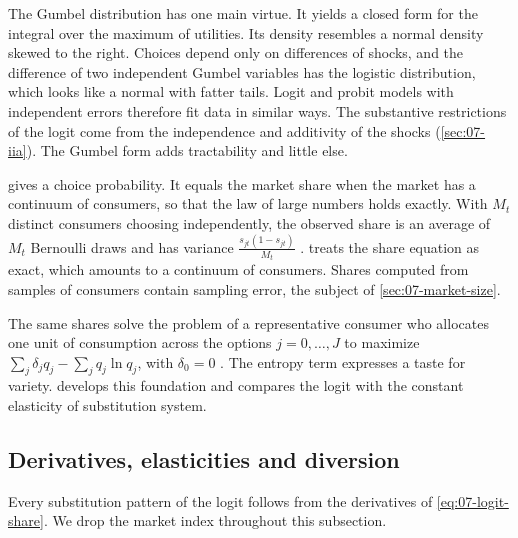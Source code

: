 \begin{remark}\label{rem:07-gumbel}
The Gumbel distribution has one main virtue. It yields a closed form for the integral over the maximum of
utilities. Its density resembles a normal density skewed to the right. Choices depend only on differences of
shocks, and the difference of two independent Gumbel variables has the logistic distribution, which looks like a
normal with fatter tails. Logit and probit models with independent errors therefore fit data in similar ways.
The substantive restrictions of the logit come from the independence and additivity of the shocks
(\cref{sec:07-iia}). The Gumbel form adds tractability and little else.
\end{remark}

\begin{remark}\label{rem:07-continuum}
 gives a choice probability. It equals the market share when the market has a
continuum of consumers, so that the law of large numbers holds exactly. With $M_t$ distinct consumers choosing
independently, the observed share is an average of $M_t$ Bernoulli draws and has variance
$\frac{s_{jt}(1 - s_{jt})}{M_t}$ \citep[footnote~4]{Berry1994}. \citet{Berry1994} treats the share equation
as exact, which amounts to a continuum of consumers. Shares computed from samples of consumers contain
sampling error, the subject of \cref{sec:07-market-size}.
\end{remark}

\begin{remark}\label{rem:07-representative}
The same shares solve the problem of a representative consumer who allocates one unit of consumption across
the options $j = 0, \dots, J$ to maximize $\sum_j \delta_j q_j - \sum_j q_j\ln q_j$, with $\delta_0 = 0$
\citep{AndersonDePalmaThisse1988, AndersonDePalmaThisse1992}. The entropy term expresses a taste for variety.
 develops this foundation and compares the logit with the constant elasticity of
substitution system.
\end{remark}

\subsection{Derivatives, elasticities and diversion}\label{sec:07-logit-elasticities}

Every substitution pattern of the logit follows from the derivatives of \eqref{eq:07-logit-share}. We drop the
market index throughout this subsection.


